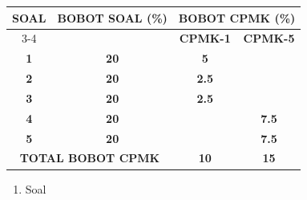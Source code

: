 ﻿\documentclass[11pt,letterpaper]{article}
\begin{document}
\begin{center}
  \begin{tabular}{|c|c|c|c|}
    \hline
    \multirow{2}{*}{\textbf{SOAL}}                  & \multirow{2}{*}{\textbf{BOBOT SOAL (\%)}} & \multicolumn{2}{c|}{\textbf{BOBOT CPMK (\%)}}                   \\ \cline{3-4}
                                                    &                                           & \textbf{CPMK-1}                               & \textbf{CPMK-5} \\ \hline
    \textbf{1}                                      & \textbf{20}                               & \textbf{5}                                    &                 \\ \hline
    \textbf{2}                                      & \textbf{20}                               & \textbf{2.5}                                  &                 \\ \hline
    \textbf{3}                                      & \textbf{20}                               & \textbf{2.5}                                  &                 \\ \hline
    \textbf{4}                                      & \textbf{20}                               &                                               & \textbf{7.5}    \\ \hline
    \textbf{5}                                      & \textbf{20}                               &                                               & \textbf{7.5}    \\ \hline
    \multicolumn{2}{|c|}{\textbf{TOTAL BOBOT CPMK}} & \textbf{10}                               & \textbf{15}                                                     \\ \hline
  \end{tabular}
\end{center}

\vspace{0.5cm}
\noindent
\begin{enumerate}
  \item Soal
\end{enumerate}
\end{document}
